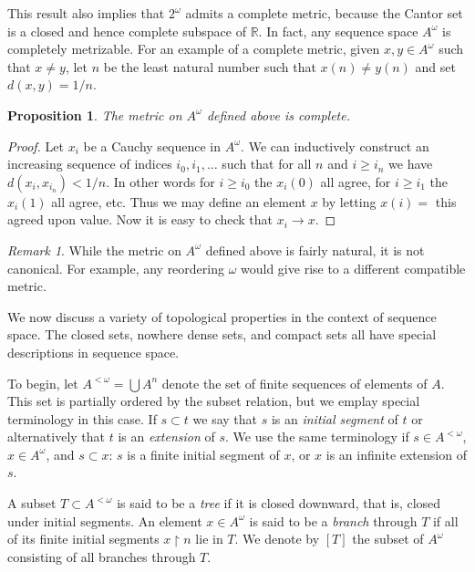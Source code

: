 \documentclass[11pt,oneside]{amsbook}
\newcommand{\RR}{\mathbb R}
\theoremstyle{definition}
\theoremstyle{plain}
\newtheorem{prop}[thm]{Proposition}
\theoremstyle{definition}
\theoremstyle{remark}
\newtheorem{rem}[thm]{Remark}
\numberwithin{equation}{section}
\numberwithin{figure}{section}
\begin{document}
This result also implies that $2^\omega$ admits a complete metric, because the Cantor set is a closed and hence complete subspace of $\RR$. In fact, any sequence space $A^\omega$ is completely metrizable. For an example of a complete metric, given $x,y\in A^\omega$ such that $x\neq y$, let $n$ be the least natural number such that $x(n)\neq y(n)$ and set $d(x,y)=1/n$. 

\begin{prop}
  The metric on $A^\omega$ defined above is complete.
\end{prop}

\begin{proof}
  Let $x_i$ be a Cauchy sequence in $A^\omega$. We can inductively construct an increasing sequence of indices $i_0,i_1,\ldots$ such that for all $n$ and $i\geq i_n$ we have $d(x_i,x_{i_n})<1/n$. In other words for $i\geq i_0$ the $x_i(0)$ all agree, for $i\geq i_1$ the $x_i(1)$ all agree, etc. Thus we may define an element $x$ by letting $x(i)=$ this agreed upon value. Now it is easy to check that $x_i\to x$.
\end{proof}

\begin{rem}
  While the metric on $A^\omega$ defined above is fairly natural, it is not canonical. For example, any reordering $\omega$ would give rise to a different compatible metric.
\end{rem}

We now discuss a variety of topological properties in the context of sequence space. The closed sets, nowhere dense sets, and compact sets all have special descriptions in sequence space.

To begin, let $A^{<\omega}=\bigcup A^n$ denote the set of finite sequences of elements of $A$. This set is partially ordered by the subset relation, but we emplay special terminology in this case. If $s\subset t$ we say that $s$ is an \emph{initial segment} of $t$ or alternatively that $t$ is an \emph{extension} of $s$. We use the same terminology if $s\in A^{<\omega}$, $x\in A^\omega$, and $s\subset x$: $s$ is a finite initial segment of $x$, or $x$ is an infinite extension of $s$.

A subset $T\subset A^{<\omega}$ is said to be a \emph{tree} if it is closed downward, that is, closed under initial segments. An element $x\in A^\omega$ is said to be a \emph{branch} through $T$ if all of its finite initial segments $x\restriction n$ lie in $T$. We denote by $[T]$ the subset of $A^\omega$ consisting of all branches through $T$.
\end{document}

